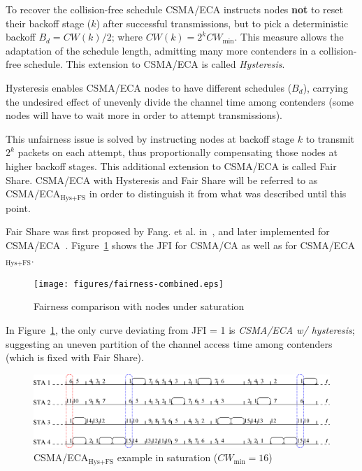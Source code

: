 \documentclass[a4paper,journal]{IEEEtran}
\begin{document}
	To recover the collision-free schedule CSMA/ECA instructs nodes {\bfseries not} to reset their backoff stage ($k$) after successful transmissions, but to pick a deterministic backoff $B_{d}=CW(k)/2$; where $CW(k)=2^{k}CW_{\min}$. This measure allows the adaptation of the schedule length, admitting many more contenders in a collision-free schedule. This extension to CSMA/ECA is called \emph{Hysteresis}.
	
	Hysteresis enables CSMA/ECA nodes to have different schedules ($B_{d}$), carrying the undesired effect of unevenly divide the channel time among contenders (some nodes will have to wait more in order to attempt transmissions).
	
	This unfairness issue is solved by instructing nodes at backoff stage $k$ to transmit $2^{k}$ packets on each attempt, thus proportionally compensating those nodes at higher backoff stages. This additional extension to CSMA/ECA is called Fair Share. CSMA/ECA with Hysteresis and Fair Share will be referred to as CSMA/ECA$_{\text{Hys+FS}}$ in order to distinguish it from what was described until this point.
	
	Fair Share was first proposed by Fang. et al. in~\cite{L_MAC}, and later implemented for CSMA/ECA~\cite{research2standards}. Figure~\ref{fig:fairness} shows the JFI for CSMA/CA as well as for CSMA/ECA$_{\text{Hys+FS}}$.
	
	\begin{figure}[htbp]
	\centering
		\texttt{[image: figures/fairness-combined.eps]}
		\caption{Fairness comparison with nodes under saturation}
		\label{fig:fairness}
	\end{figure}
	
	In Figure~\ref{fig:fairness}, the only curve deviating from JFI = 1 is \emph{CSMA/ECA w/ hysteresis}; suggesting an uneven partition of the channel access time among contenders (which is fixed with Fair Share).
	
	\begin{figure}[tbhp]
	\centering
		\includegraphics[width=0.8\linewidth]{figures/csma_eca_different_backoff_short.eps}
		\caption{CSMA/ECA$_{\text{Hys+FS}}$ example in saturation ($CW_{\min}=16$)}
		\label{fig:ECA+Hyst}
	\end{figure}
	
\end{document}
